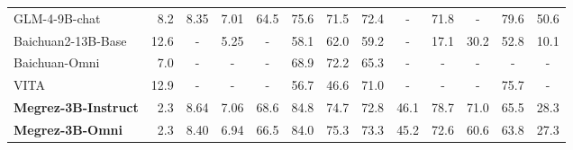 \begin{table}[!ht]
{\begin{tabular}{@{}l r *{11}{c} @{}}
    GLM-4-9B-chat & 8.2 & 8.35 & 7.01 & 64.5 & 75.6 & 71.5 & 72.4 & - & 71.8 & - & 79.6 & 50.6 \\
    Baichuan2-13B-Base & 12.6 & - & 5.25 & - & 58.1 & 62.0 & 59.2 & - & 17.1 & 30.2 & 52.8 & 10.1 \\
    Baichuan-Omni & 7.0 & - & - & - & 68.9 & 72.2 & 65.3 & - & - & - & - & - \\
    VITA & 12.9 & - & - & - & 56.7 & 46.6 & 71.0 & - & - & - & 75.7 & - \\
    \midrule
    \textbf{Megrez-3B-Instruct} & 2.3 & 8.64 & 7.06 & 68.6 & 84.8 & 74.7 & 72.8 & 46.1 & 78.7 & 71.0 & 65.5 & 28.3 \\
    \textbf{Megrez-3B-Omni} & 2.3 & 8.40 & 6.94 & 66.5 & 84.0 & 75.3 & 73.3 & 45.2 & 72.6 & 60.6 & 63.8 & 27.3 \\
    \bottomrule
    \end{tabular}}
\end{table}
